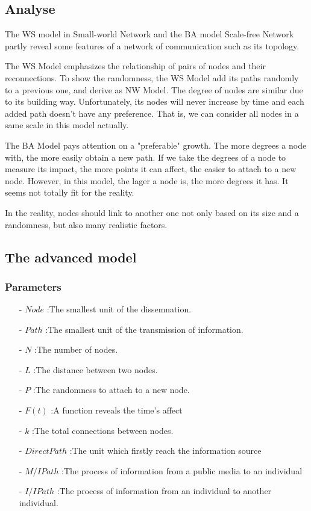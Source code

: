 \subsection{Analyse}
\par The WS model in Small-world Network and the BA model Scale-free Network partly reveal some features of a network of communication such as its topology.
\par The WS Model emphasizes the relationship of pairs of nodes and their reconnections. To show the randomness, the WS Model add its paths randomly to a previous one, and derive as NW Model. The degree of nodes are similar due to its building way. Unfortunately, its nodes will never increase by time and each added path doesn't have any preference. That is, we can consider all nodes in a same scale in this model actually.  
 
\par The BA Model pays attention on a "preferable" growth. The more degrees a node with, the more easily obtain a new path. If we take the degrees of a node to measure its impact, the more points it can affect, the easier to attach to a new node. However, in this model, the lager a node is, the more degrees it has. It seems not totally fit for the reality.
\par In the reality, nodes should link to another one not only based on its size and a randomness, but also many realistic factors.
\subsection{The advanced model}
\subsubsection*{Parameters}
\begin{itemize}
	\item[-] $Node$ :The smallest unit of the dissemnation.
	\item[-] $Path$ :The smallest unit of the transmission of information.
	\item[-] $N$ :The number of nodes.
	\item[-] $L$ :The distance between two nodes.
	\item[-] $P$ :The randomness to attach to a new node.

		\item[-] $F(t)$ :A function  reveals the time's affect
		\item[-] $k$ :The total connections between nodes.
	\item[-] $Direct Path$  :The unit which firstly reach the information source
	\item[-] $M/I Path$  :The process of information from a public media to an individual
	\item[-] $I/I Path$  :The process of information from an individual to another individual.
\end{itemize}
